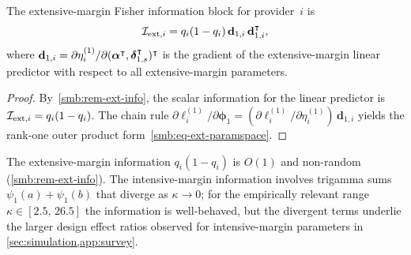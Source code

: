 \begin{proposition}
\label{smb:prop-ext-paramspace}
  The extensive-margin Fisher information block for provider~$i$ is
  \begin{equation}\label{smb:eq-ext-paramspace}
    \mathcal{I}_{\textup{ext},i}
    = q_i(1-q_i)\,\mathbf{d}_{1,i}\,\mathbf{d}_{1,i}^\intercal,
  \end{equation}
  where
  $\mathbf{d}_{1,i}
  = \partial\eta_i^{(1)}/\partial(\boldsymbol{\alpha}^\intercal,\boldsymbol{\delta}_{1,s}^\intercal)^\intercal$
  is the gradient of the extensive-margin linear predictor with respect to
  all extensive-margin parameters.
\end{proposition}

\begin{proof}
  By~\cref{smb:rem-ext-info}, the scalar information for the linear
  predictor is $\mathcal{I}_{\textup{ext},i} = q_i(1-q_i)$.  The chain rule
  $\partial\ell_i^{(1)}/\partial\boldsymbol{\phi}_1
  = (\partial\ell_i^{(1)}/\partial\eta_i^{(1)})\,\mathbf{d}_{1,i}$
  yields the rank-one outer product
  form~\eqref{smb:eq-ext-paramspace}.
\end{proof}


\begin{remark}\label{smb:rem-info-rates}
  The extensive-margin information $q_i(1-q_i)$ is $O(1)$ and
  non-random (\cref{smb:rem-ext-info}).  The intensive-margin
  information involves trigamma sums $\psi_1(a) + \psi_1(b)$ that
  diverge as $\kappa \to 0$; for the empirically relevant range
  $\kappa \in [2.5,\, 26.5]$ the information is well-behaved, but
  the divergent terms underlie the larger design effect ratios
  observed for intensive-margin parameters in
  \cref{sec:simulation,app:survey}.
\end{remark}

